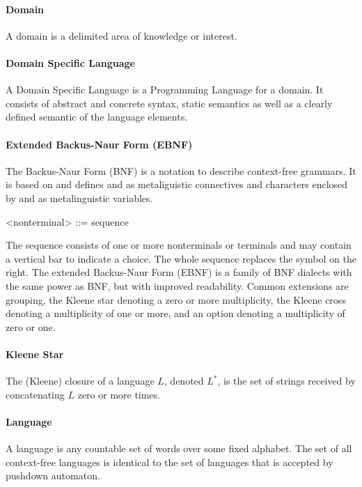\paragraph{Domain} A domain is a delimited area of knowledge or interest. \cite{MDSD}

\paragraph{Domain Specific Language} A Domain Specific Language is a Programming Language for a domain. It consists of abstract and concrete syntax, static semantics as well as a clearly defined semantic of the language elements. \cite{MDSD}

\paragraph{Extended Backus-Naur Form (EBNF)} 
The Backus-Naur Form (BNF) is a notation to describe context-free grammars. It is based on \cite{BNF} and defines \code{:=} and \code{|} as metaliguistic connectives and characters enclosed by \code{<} and \code{>} as metalinguistic variables.
\begin{xtxt}
 <nonterminal> ::= sequence
\end{xtxt}
The sequence consists of one or more nonterminals or terminals and may contain a vertical bar to indicate a choice. The whole sequence replaces the symbol on the right. The extended Backus-Naur Form (EBNF) is a family of BNF dialects with the same power as BNF, but with improved readability. Common extensions are grouping, the Kleene star denoting a zero or more multiplicity, the Kleene cross denoting a multiplicity of one or more, and an option denoting a multiplicity of zero or one. \cite{ParserBook}
 
\paragraph{Kleene Star} 
The (Kleene) closure of a language $L$, denoted $L^*$, is the set of strings received by concatenating $L$ zero or more times. \cite{DragonBook}

\paragraph{Language} 
A language is any countable set of words over some fixed alphabet. The set of all context-free languages is identical to the set of languages that is accepted by pushdown automaton. \cite{DragonBook}

